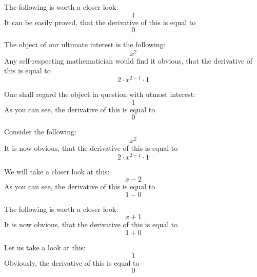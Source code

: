 \documentclass{article}
\begin{document}
The following is worth a closer look:
\begin{equation}
1 
\end{equation}
It can be easily proved, that the derivative of this is equal to
\begin{equation}
0 
\end{equation}

The object of our ultimate interest is the following:
\begin{equation}
x ^{2 } 
\end{equation}
Any self-respecting mathematician would find it obvious, that the derivative of this is equal to
\begin{equation}
2 \cdot x ^{2 - 1 } \cdot 1 
\end{equation}

One shall regard the object in question with utmost interest:
\begin{equation}
1 
\end{equation}
As you can see, the derivative of this is equal to
\begin{equation}
0 
\end{equation}

Consider the following:
\begin{equation}
x ^{2 } 
\end{equation}
It is now obvious, that the derivative of this is equal to
\begin{equation}
2 \cdot x ^{2 - 1 } \cdot 1 
\end{equation}

We will take a closer look at this:
\begin{equation}
x - 2 
\end{equation}
As you can see, the derivative of this is equal to
\begin{equation}
1 - 0 
\end{equation}

The following is worth a closer look:
\begin{equation}
x + 1 
\end{equation}
It is now obvious, that the derivative of this is equal to
\begin{equation}
1 + 0 
\end{equation}

Let us take a look at this:
\begin{equation}
1 
\end{equation}
Obviously, the derivative of this is equal to
\begin{equation}
0 
\end{equation}
\end{document}
